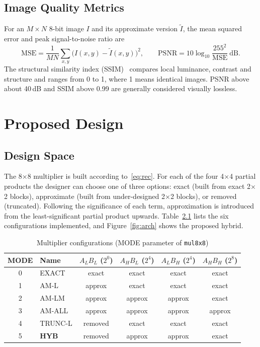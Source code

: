 \documentclass[12pt,a4paper,oneside]{report}
\begin{document}
\section{Image Quality Metrics}
For an $M\times N$ 8-bit image $I$ and its approximate version $\tilde{I}$, the mean squared error and peak signal-to-noise ratio are
\begin{equation}
\text{MSE}=\frac{1}{MN}\sum_{x,y}\bigl(I(x,y)-\tilde{I}(x,y)\bigr)^2,\qquad
\text{PSNR}=10\log_{10}\frac{255^2}{\text{MSE}}\ \text{dB}.
\end{equation}
The structural similarity index (SSIM)~\cite{wang2004ssim} compares local luminance, contrast and structure and ranges from 0 to 1, where 1 means identical images. PSNR above about 40\,dB and SSIM above 0.99 are generally considered visually lossless.

\chapter{Proposed Design}

\section{Design Space}
The 8$\times$8 multiplier is built according to~\eqref{eq:rec}. For each of the four 4$\times$4 partial products the designer can choose one of three options: exact (built from exact 2$\times$2 blocks), approximate (built from under-designed 2$\times$2 blocks), or removed (truncated). Following the significance of each term, approximation is introduced from the least-significant partial product upwards. Table~\ref{tab:modes} lists the six configurations implemented, and Figure~\ref{fig:arch} shows the proposed hybrid.

\begin{table}[ht]
\centering
\caption{Multiplier configurations (MODE parameter of \texttt{mul8x8})}
\label{tab:modes}
\begin{tabular}{clcccc}
\toprule
MODE & Name & $A_LB_L$ ($2^0$) & $A_HB_L$ ($2^4$) & $A_LB_H$ ($2^4$) & $A_HB_H$ ($2^8$) \\
\midrule
0 & EXACT   & exact  & exact  & exact  & exact \\
1 & AM-L    & approx & exact  & exact  & exact \\
2 & AM-LM   & approx & approx & approx & exact \\
3 & AM-ALL  & approx & approx & approx & approx \\
4 & TRUNC-L & removed & exact & exact  & exact \\
5 & \textbf{HYB} & removed & approx & approx & exact \\
\bottomrule
\end{tabular}
\end{table}
\end{document}
